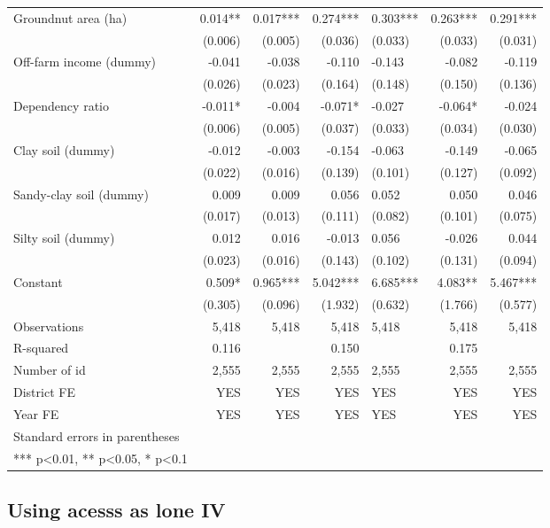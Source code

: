 \documentclass[
]{article}
\begin{document}
\begin{landscape}
\begin{longtable}[t]{lrrrlrr}
Groundnut area (ha) & 0.014** & 0.017*** & 0.274*** & 0.303*** & 0.263*** & 0.291***\\
\addlinespace
 & (0.006) & (0.005) & (0.036) & (0.033) & (0.033) & (0.031)\\
Off-farm income (dummy) & -0.041 & -0.038 & -0.110 & -0.143 & -0.082 & -0.119\\
 & (0.026) & (0.023) & (0.164) & (0.148) & (0.150) & (0.136)\\
Dependency ratio & -0.011* & -0.004 & -0.071* & -0.027 & -0.064* & -0.024\\
 & (0.006) & (0.005) & (0.037) & (0.033) & (0.034) & (0.030)\\
\addlinespace
Clay soil (dummy) & -0.012 & -0.003 & -0.154 & -0.063 & -0.149 & -0.065\\
 & (0.022) & (0.016) & (0.139) & (0.101) & (0.127) & (0.092)\\
Sandy-clay soil (dummy) & 0.009 & 0.009 & 0.056 & 0.052 & 0.050 & 0.046\\
 & (0.017) & (0.013) & (0.111) & (0.082) & (0.101) & (0.075)\\
Silty soil (dummy) & 0.012 & 0.016 & -0.013 & 0.056 & -0.026 & 0.044\\
\addlinespace
 & (0.023) & (0.016) & (0.143) & (0.102) & (0.131) & (0.094)\\
Constant & 0.509* & 0.965*** & 5.042*** & 6.685*** & 4.083** & 5.467***\\
 & (0.305) & (0.096) & (1.932) & (0.632) & (1.766) & (0.577)\\
Observations & 5,418 & 5,418 & 5,418 & 5,418 & 5,418 & 5,418\\
R-squared & 0.116 &  & 0.150 &  & 0.175 & \\
\addlinespace
Number of id & 2,555 & 2,555 & 2,555 & 2,555 & 2,555 & 2,555\\
District FE & YES & YES & YES & YES & YES & YES\\
Year FE & YES & YES & YES & YES & YES & YES\\
Standard errors in parentheses &  &  &  &  &  & \\
*** p<0.01, ** p<0.05, * p<0.1 &  &  &  &  &  & \\*
\end{longtable}
\endgroup{}
\end{landscape}
\newpage

\hypertarget{using-acesss-as-lone-iv}{%
\subsection{Using acesss as lone IV}\label{using-acesss-as-lone-iv}}
\end{document}
